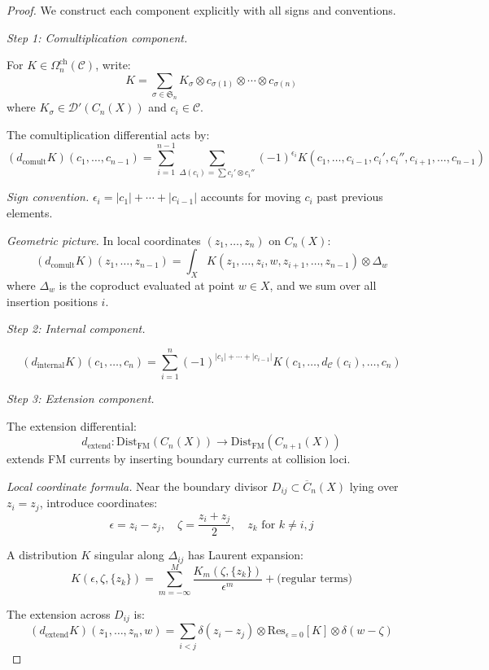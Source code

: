\begin{proof}
We construct each component explicitly with all signs and conventions.

\emph{Step 1: Comultiplication component.}

For $K \in \Omega^{\text{ch}}_n(\mathcal{C})$, write:
\[K = \sum_{\sigma \in \mathfrak{S}_n} K_\sigma \otimes c_{\sigma(1)} \otimes \cdots
\otimes c_{\sigma(n)}\]
where $K_\sigma \in \mathcal{D}'(C_n(X))$ and $c_i \in \mathcal{C}$.

The comultiplication differential acts by:
\[(d_{\text{comult}}K)(c_1, \ldots, c_{n-1}) = \sum_{i=1}^{n-1} \sum_{\Delta(c_i) =
\sum c_i' \otimes c_i''} (-1)^{\epsilon_i} K(c_1, \ldots, c_{i-1}, c_i', c_i'',
c_{i+1}, \ldots, c_{n-1})\]

\emph{Sign convention.} $\epsilon_i = |c_1| + \cdots + |c_{i-1}|$ accounts for
moving $c_i$ past previous elements.

\emph{Geometric picture.} In local coordinates $(z_1, \ldots, z_n)$ on $C_n(X)$:
\[
(d_{\text{comult}}K)(z_1, \ldots, z_{n-1}) = \int_X K(z_1, \ldots, z_i, w, z_{i+1},
\ldots, z_{n-1}) \otimes \Delta_w
\]
where $\Delta_w$ is the coproduct evaluated at point $w \in X$, and we sum over
all insertion positions $i$.

\emph{Step 2: Internal component.}

\[(d_{\text{internal}}K)(c_1, \ldots, c_n) = \sum_{i=1}^n (-1)^{|c_1| + \cdots +
|c_{i-1}|} K(c_1, \ldots, d_{\mathcal{C}}(c_i), \ldots, c_n)\]

\emph{Step 3: Extension component.}

The extension differential:
\[
d_{\text{extend}}\colon
\mathrm{Dist}_{\mathrm{FM}}(C_n(X))\to
\mathrm{Dist}_{\mathrm{FM}}(C_{n+1}(X))
\]
extends FM currents by inserting boundary currents at collision loci.

\emph{Local coordinate formula.} Near the boundary divisor
$D_{ij}\subset\overline{C}_n(X)$ lying over $z_i=z_j$, introduce
coordinates:
\[\epsilon = z_i - z_j, \quad \zeta = \frac{z_i + z_j}{2}, \quad z_k \text{ for } k
\neq i,j\]

A distribution $K$ singular along $\Delta_{ij}$ has Laurent expansion:
\[K(\epsilon, \zeta, \{z_k\}) = \sum_{m=-\infty}^{M} \frac{K_m(\zeta, \{z_k\})}{\epsilon^m}
+ \text{(regular terms)}\]

The extension across $D_{ij}$ is:
\[
(d_{\text{extend}}K)(z_1, \ldots, z_n, w) = \sum_{i<j} \delta(z_i - z_j) \otimes
\text{Res}_{\epsilon=0}[K] \otimes \delta(w - \zeta)
\]


\end{proof}
